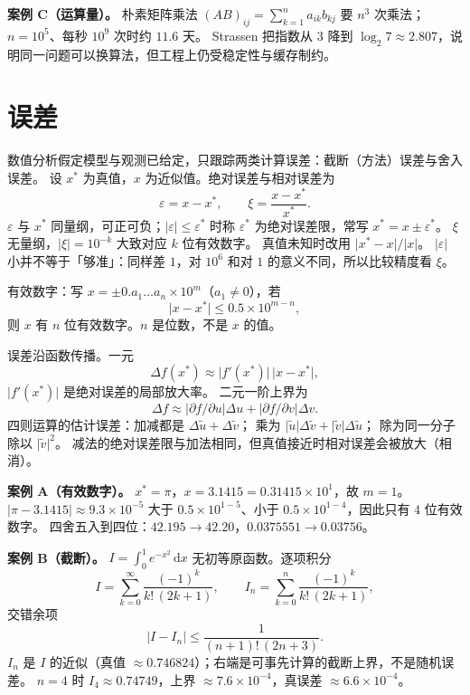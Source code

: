 \textbf{案例 C（运算量）。}
朴素矩阵乘法 $(AB)_{ij}=\sum_{k=1}^n a_{ik}b_{kj}$ 要 $n^3$ 次乘法；
$n=10^5$、每秒 $10^9$ 次时约 $11.6$ 天。
Strassen 把指数从 $3$ 降到 $\log_2 7\approx 2.807$，说明同一问题可以换算法，但工程上仍受稳定性与缓存制约。

\section{误差}

数值分析假定模型与观测已给定，只跟踪两类计算误差：截断（方法）误差与舍入误差。
设 $x^*$ 为真值，$x$ 为近似值。绝对误差与相对误差为
\begin{equation}
\varepsilon=x-x^*,
\qquad
\xi=\frac{x-x^*}{x^*}.
\end{equation}
$\varepsilon$ 与 $x^*$ 同量纲，可正可负；$\lvert\varepsilon\rvert\le\varepsilon^*$ 时称 $\varepsilon^*$ 为绝对误差限，常写 $x^*=x\pm\varepsilon^*$。
$\xi$ 无量纲，$\lvert\xi\rvert=10^{-k}$ 大致对应 $k$ 位有效数字。
真值未知时改用 $\lvert x^*-x\rvert/\lvert x\rvert$。
$\lvert\varepsilon\rvert$ 小并不等于「够准」：同样差 $1$，对 $10^6$ 和对 $1$ 的意义不同，所以比较精度看 $\xi$。

有效数字：写 $x=\pm 0.a_1\ldots a_n\times 10^m$（$a_1\neq 0$），若
\[
\lvert x-x^*\rvert\le 0.5\times 10^{m-n},
\]
则 $x$ 有 $n$ 位有效数字。$n$ 是位数，不是 $x$ 的值。

误差沿函数传播。一元
\[
\Delta f(x^*)\approx\lvert f'(x^*)\rvert\,\lvert x-x^*\rvert,
\]
$\lvert f'(x^*)\rvert$ 是绝对误差的局部放大率。
二元一阶上界为
\[
\Delta f\approx\bigl\lvert\partial f/\partial u\bigr\rvert\Delta u
+\bigl\lvert\partial f/\partial v\bigr\rvert\Delta v.
\]
四则运算的估计误差：加减都是 $\Delta\tilde u+\Delta\tilde v$；
乘为 $\lvert\tilde u\rvert\Delta\tilde v+\lvert\tilde v\rvert\Delta\tilde u$；
除为同一分子除以 $\lvert\tilde v\rvert^2$。
减法的绝对误差限与加法相同，但真值接近时相对误差会被放大（相消）。


\textbf{案例 A（有效数字）。}
$x^*=\pi$，$x=3.1415=0.31415\times 10^1$，故 $m=1$。
$\lvert\pi-3.1415\rvert\approx 9.3\times 10^{-5}$ 大于 $0.5\times 10^{1-5}$、小于 $0.5\times 10^{1-4}$，因此只有 $4$ 位有效数字。
四舍五入到四位：$42.195\to 42.20$，$0.0375551\to 0.03756$。

\textbf{案例 B（截断）。}
$I=\int_0^1 e^{-x^2}\,\mathrm{d}x$ 无初等原函数。逐项积分
\[
I=\sum_{k=0}^{\infty}\frac{(-1)^k}{k!\,(2k+1)},
\qquad
I_n=\sum_{k=0}^{n}\frac{(-1)^k}{k!\,(2k+1)},
\]
交错余项
\[
\lvert I-I_n\rvert\le\frac{1}{(n+1)!\,(2n+3)}.
\]
$I_n$ 是 $I$ 的近似（真值 $\approx 0.746824$）；右端是可事先计算的截断上界，不是随机误差。
$n=4$ 时 $I_4\approx 0.74749$，上界 $\approx 7.6\times 10^{-4}$，真误差 $\approx 6.6\times 10^{-4}$。

